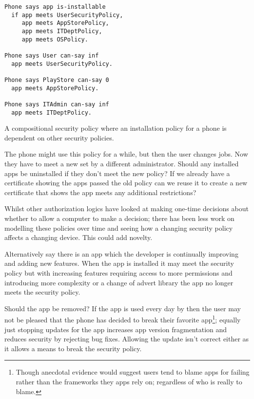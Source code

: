 \documentclass[report.tex]{subfiles}
\begin{document}
\begin{marginfigure}\label{example:composition}
  \begin{lstlisting}[language=SecPAL]
Phone says app is-installable
  if app meets UserSecurityPolicy,
     app meets AppStorePolicy,
     app meets ITDeptPolicy,
     app meets OSPolicy.

Phone says User can-say inf
  app meets UserSecurityPolicy.

Phone says PlayStore can-say 0
  app meets AppStorePolicy.

Phone says ITAdmin can-say inf
  app meets ITDeptPolicy.
  \end{lstlisting}
  \caption{A compositional security policy where an installation policy for a
    phone is dependent on other security policies.}
\end{marginfigure}
     
The phone might use this policy for a while, but then the user changes jobs.
Now they have to meet a new  set by a different administrator.
Should any installed apps be uninstalled if they don't meet the new policy?  If
we already have a certificate showing the apps passed the old policy can we
reuse it to create a new certificate that shows the app meets any additional
restrictions?

Whilst other authorization logics have looked at making one-time decisions about
whether to allow a computer to make a decision; there has been less work on
modelling these policies over time and seeing how a changing security policy
affects a changing device.  This could add novelty.

Alternatively say there is an app which the developer is continually improving
and adding new features.  When the app is installed it may meet the security
policy but with increasing features requiring access to more permissions and
introducing more complexity or a change of advert library the app no longer
meets the security policy.

Should the app be removed?  If the app is used every day by then the user may
not be pleased that the phone has decided to break their favorite
app\footnote{Though anecdotal evidence would suggest users tend to blame apps
  for failing rather than the frameworks they apps rely on; regardless of who is
  really to blame.}; equally just stopping updates for the app increases app
version fragmentation and reduces security by rejecting bug fixes.  Allowing the
update isn't correct either as it allows a means to break the security policy.
\end{document}
